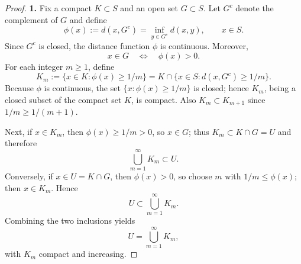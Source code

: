 \documentclass[12pt]{article}
\renewcommand{\(}{\left(}%
\renewcommand{\)}{\right)}%
\renewcommand{\[}{\left[}%
\renewcommand{\]}{\right]}%
\newtheorem{proof}{Proof.}}
\begin{document}
\begin{proof}
\textbf{1.}
Fix a compact $K\subset S$ and an open set $G\subset S$. Let $G^c$ denote the complement of $G$ and define
\begin{equation*}
\phi(x):=d(x,G^c)=\inf_{y\in G^c} d(x,y),\qquad x\in S.
\end{equation*}
Since $G^c$ is closed, the distance function $\phi$ is continuous. Moreover,
\begin{equation*}
x\in G \quad \Longleftrightarrow \quad \phi(x)>0.
\end{equation*}
For each integer $m\ge 1$, define
\begin{equation*}
K_m:=\{x\in K:\phi(x)\ge 1/m\}
=
K\cap \{x\in S: d(x,G^c)\ge 1/m\}.
\end{equation*}
Because $\phi$ is continuous, the set $\{x:\phi(x)\ge 1/m\}$ is closed; hence $K_m$, being a closed subset
of the compact set $K$, is compact. Also $K_m\subset K_{m+1}$ since $1/m\ge 1/(m+1)$.

Next, if $x\in K_m$, then $\phi(x)\ge 1/m>0$, so $x\in G$; thus $K_m\subset K\cap G=U$ and therefore
\begin{equation*}
\bigcup_{m=1}^\infty K_m \subset U.
\end{equation*}
Conversely, if $x\in U=K\cap G$, then $\phi(x)>0$, so choose $m$ with $1/m\le \phi(x)$; then $x\in K_m$.
Hence
\begin{equation*}
U \subset \bigcup_{m=1}^\infty K_m.
\end{equation*}
Combining the two inclusions yields
\begin{equation*}
U=\bigcup_{m=1}^\infty K_m,
\end{equation*}
with $K_m$ compact and increasing.


\end{proof}
\end{document}

